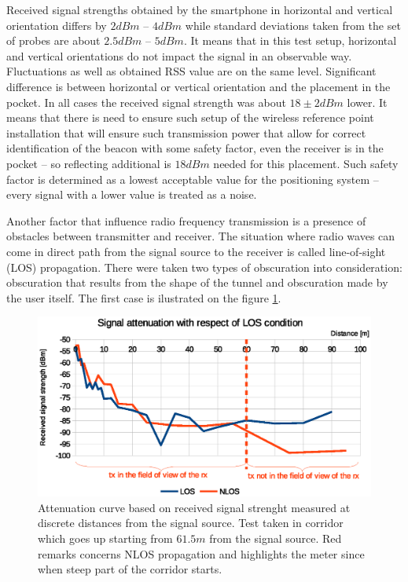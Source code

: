 \documentclass[../main.tex]{subfiles}
\begin{document}
Received signal strengths obtained by the smartphone in horizontal and vertical orientation differs by $2 dBm$ -- $4 dBm$ while standard deviations taken from the set of probes are about $2.5 dBm$ -- $5 dBm$. It means that in this test setup, horizontal and vertical orientations do not impact the signal in an observable way. Fluctuations as well as obtained RSS value are on the same level. Significant difference is between horizontal or vertical orientation and the placement in the pocket. In all cases the received signal strength was about $18\pm2 dBm$ lower. It means that there is need to ensure such setup of the wireless reference point installation that will ensure such transmission power that allow for correct identification of the beacon with some safety factor, even the receiver is in the pocket -- so reflecting additional is $18dBm$ needed for this placement. Such safety factor is determined as a lowest acceptable value for the positioning system -- every signal with a lower value is treated as a noise.

Another factor that influence radio frequency transmission is a presence of obstacles between transmitter and receiver. The situation where radio waves can come in direct path from the signal source to the receiver is called line-of-sight (LOS) propagation. There were taken two types of obscuration into consideration: obscuration that results from the shape of the tunnel and obscuration made by the user itself. The first case is ilustrated on the figure \ref{fig:tests_case4_los}.

\begin{figure}[!htbp]
\includegraphics[width=\textwidth, keepaspectratio]{pictures/tests_case4_los}
\centering
\caption{Attenuation curve based on received signal strenght measured at discrete distances from the signal source. Test taken in corridor which goes up starting from $61.5 m$ from the signal source. Red remarks concerns NLOS propagation and highlights the meter since when steep part of the corridor starts.}
\label{fig:tests_case4_los}
\end{figure}
\end{document}
